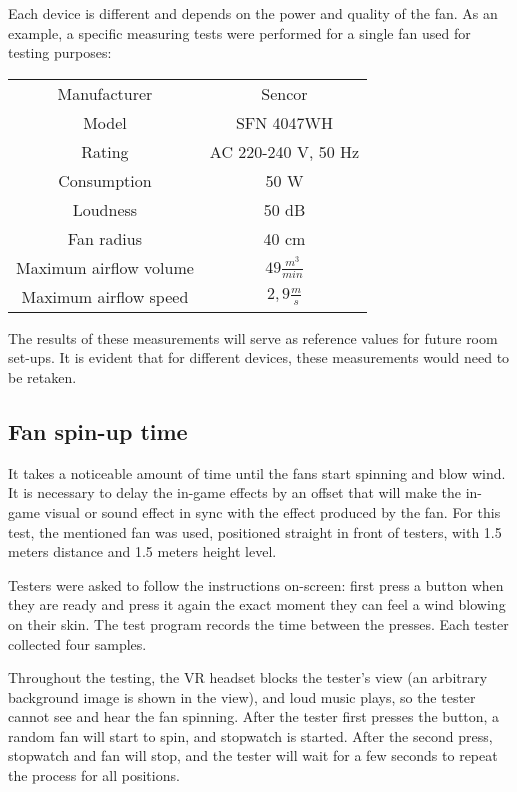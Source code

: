 Each device is different and depends on the power and quality of the fan.
As an example, a specific measuring tests were performed for a single fan
used for testing purposes:


\begin{center}
\begin{tabular}{|c|c|}
\hline
Manufacturer & Sencor \\ 
Model & SFN 4047WH \\ 
Rating & AC 220-240 V, 50 Hz \\ 
Consumption & 50 W \\ 
Loudness & 50 dB \\ 
Fan radius & 40 cm \\ 
Maximum airflow volume & $ 49 \frac{m^3}{min} $ \\ 
Maximum airflow speed & $ 2,9 \frac{m}{s} $ \\ 
\hline
\end{tabular}
\end{center}

The results of these measurements will serve as reference values for future
room set-ups. It is evident that for different devices, these measurements
would need to be retaken.


\hypertarget{x-fan-spin-up-time}{\subsection{Fan spin-up time}}
It takes a noticeable amount of time until the fans start spinning and
blow wind. It is necessary to delay the in-game effects by an offset that
will make the in-game visual or sound effect in sync with the effect
produced by the fan.
For this test, the mentioned fan was used, positioned straight in front of
testers, with 1.5 meters distance and 1.5 meters height level.


Testers were asked to follow the instructions on-screen: first press a button
when they are ready and press it again the exact moment they can feel a wind
blowing on their skin. The test program records the time between the presses.
Each tester collected four samples.


Throughout the testing, the VR headset blocks the tester’s view (an arbitrary
background image is shown in the view), and loud music plays, so the tester
cannot see and hear the fan spinning. After the tester first presses the button,
a random fan will start to spin, and stopwatch is started. After the second
press, stopwatch and fan will stop, and the tester will wait for a few seconds
to repeat the process for all positions.


